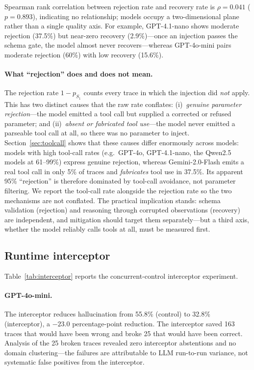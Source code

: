 \documentclass{ieeeaccess}
\begin{document}
Spearman rank correlation between rejection rate and recovery rate is
$\rho{=}0.041$ ($p{=}0.893$), indicating no relationship; models occupy a
two-dimensional plane rather than a single quality axis.
For example, GPT-4.1-nano shows moderate rejection (37.5\%) but near-zero
recovery (2.9\%)---once an injection passes the schema gate, the model almost
never recovers---whereas GPT-4o-mini pairs moderate rejection (60\%) with low
recovery (15.6\%).

\paragraph{What ``rejection'' does and does not mean.}
The rejection rate $1{-}p_{S_1}$ counts every trace in which the injection did
\emph{not} apply. This has two distinct causes that the raw rate conflates:
(i)~\emph{genuine parameter rejection}---the model emitted a tool call but
supplied a corrected or refused parameter; and (ii)~\emph{absent or fabricated
tool use}---the model never emitted a parseable tool call at all, so there was
no parameter to inject. Section~\ref{sec:toolcall} shows that these causes
differ enormously across models: models with high tool-call rates
(e.g.\ GPT-4o, GPT-4.1-nano, the Qwen2.5 models at 61--99\%) express genuine
rejection, whereas Gemini-2.0-Flash emits a real tool call in only 5\% of
traces and \emph{fabricates} tool use in 37.5\%. Its apparent 95\% ``rejection''
is therefore dominated by tool-call avoidance, not parameter filtering. We
report the tool-call rate alongside the rejection rate so the two mechanisms
are not conflated. The practical implication stands: schema validation
(rejection) and reasoning through corrupted observations (recovery) are
independent, and mitigation should target them separately---but a third axis,
whether the model reliably calls tools at all, must be measured first.

\subsection{Runtime interceptor}
\label{sec:interceptor}

Table~\ref{tab:interceptor} reports the concurrent-control interceptor
experiment.



\paragraph{GPT-4o-mini.}
The interceptor reduces hallucination from 55.8\% (control) to 32.8\%
(interceptor), a $-23.0$ percentage-point reduction.
The interceptor saved 163 traces that would have been wrong and broke
25 that would have been correct.
Analysis of the 25 broken traces revealed zero interceptor abstentions
and no domain clustering---the failures are attributable to LLM
run-to-run variance, not systematic false positives from the
interceptor.
\end{document}
